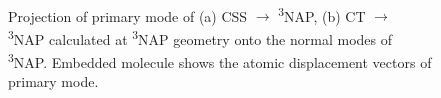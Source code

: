 \begin{figure}[!t]
\\
\caption{
Projection of primary mode of (a) CSS $\rightarrow$ \textsuperscript{3}NAP, (b) CT $\rightarrow$ \textsuperscript{3}NAP calculated at \textsuperscript{3}NAP geometry onto the normal modes of \textsuperscript{3}NAP. Embedded molecule shows the atomic displacement vectors of primary mode.}\label{projT1}
\end{figure}

